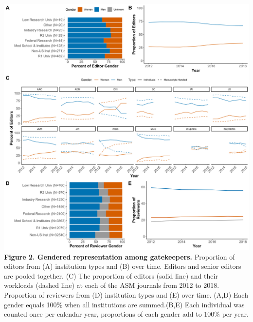 \documentclass[11pt,]{article}
\begin{document}
\includegraphics{Figure_2.png} \textbf{Figure 2. Gendered representation
among gatekeepers.} Proportion of editors from (A) institution types and
(B) over time. Editors and senior editors are pooled together. (C) The
proportion of editors (solid line) and their workloads (dashed line) at
each of the ASM journals from 2012 to 2018. Proportion of reviewers from
(D) institution types and (E) over time. (A,D) Each gender equals 100\%
when all institutions are summed.(B,E) Each individual was counted once
per calendar year, proportions of each gender add to 100\% per year.

\newpage
\end{document}
